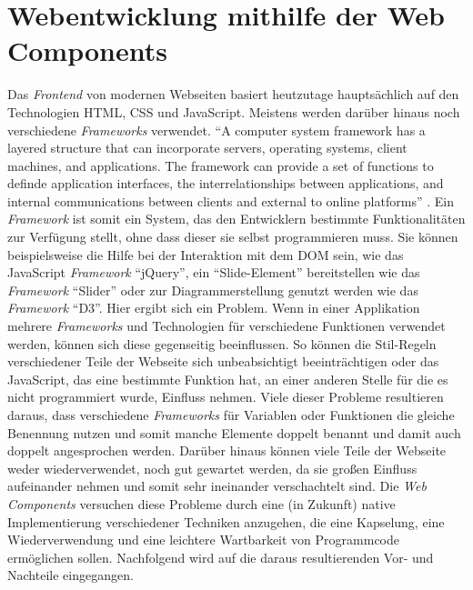 \documentclass[12pt, paper=a4, bibtotoc, toc=listof, headsepline=true]{scrreprt}
\begin{document}
		\section{Webentwicklung mithilfe der Web Components}
		Das \emph{Frontend} von modernen Webseiten basiert heutzutage hauptsächlich auf den Technologien \ac{HTML}, \ac{CSS} und JavaScript. Meistens werden darüber hinaus noch verschiedene \emph{Frameworks} verwendet. \enquote{A computer system framework has a layered structure that can incorporate servers, operating systems, client machines, and applications. The framework can provide a set of functions to definde application interfaces, the interrelationships between applications, and internal communications between clients and external to online platforms} \cite[S.15]{stuart2013roadmap}. Ein \emph{Framework} ist somit ein System, das den Entwicklern bestimmte Funktionalitäten zur Verfügung stellt, ohne dass dieser sie selbst programmieren muss. Sie können beispielsweise die Hilfe bei der Interaktion mit dem \ac{DOM} sein, wie das JavaScript \emph{Framework} \enquote{jQuery}, ein \enquote{Slide-Element} bereitstellen wie das \emph{Framework} \enquote{Slider} oder zur Diagrammerstellung genutzt werden wie das \emph{Framework} \enquote{D3}. Hier ergibt sich ein Problem. Wenn in einer Applikation mehrere \emph{Frameworks} und Technologien für verschiedene Funktionen verwendet werden, können sich diese gegenseitig beeinflussen. So können die Stil-Regeln verschiedener Teile der Webseite sich unbeabsichtigt beeinträchtigen oder das JavaScript, das eine bestimmte Funktion hat, an einer anderen Stelle für die es nicht programmiert wurde, Einfluss nehmen. Viele dieser Probleme resultieren daraus, dass verschiedene \emph{Frameworks} für Variablen oder Funktionen die gleiche Benennung nutzen und somit manche Elemente doppelt benannt und damit auch doppelt angesprochen werden. Darüber hinaus können viele Teile der Webseite weder wiederverwendet, noch gut gewartet werden, da sie großen Einfluss aufeinander nehmen und somit sehr ineinander verschachtelt sind.
		Die \emph{Web Components} versuchen diese Probleme durch eine (in Zukunft) native Implementierung verschiedener Techniken anzugehen, die eine Kapselung, eine Wiederverwendung und eine leichtere Wartbarkeit von Programmcode ermöglichen sollen. Nachfolgend wird auf die daraus resultierenden Vor- und Nachteile eingegangen. 			
\end{document}
